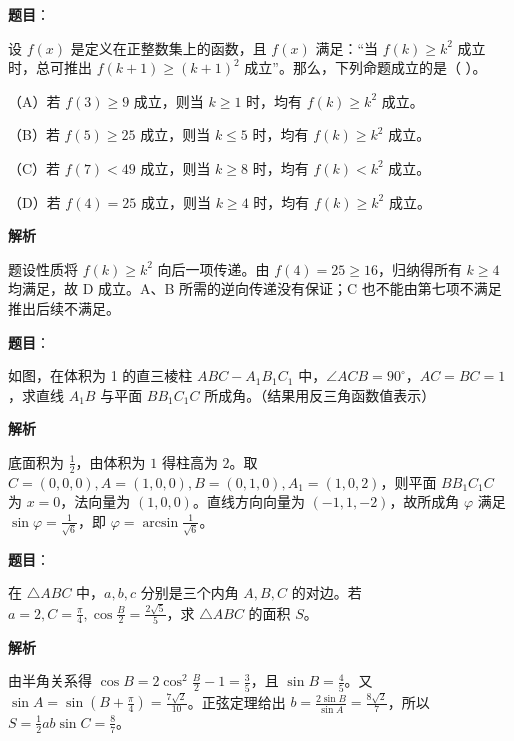 \begin{answer}

\textbf{题目}：

设 $f(x)$ 是定义在正整数集上的函数，且 $f(x)$ 满足：“当 $f(k)\ge k^2$ 成立时，总可推出 $f(k+1)\ge(k+1)^2$ 成立”。那么，下列命题成立的是（ ）。

（A）若 $f(3)\ge9$ 成立，则当 $k\ge1$ 时，均有 $f(k)\ge k^2$ 成立。

（B）若 $f(5)\ge25$ 成立，则当 $k\le5$ 时，均有 $f(k)\ge k^2$ 成立。

（C）若 $f(7)<49$ 成立，则当 $k\ge8$ 时，均有 $f(k)<k^2$ 成立。

（D）若 $f(4)=25$ 成立，则当 $k\ge4$ 时，均有 $f(k)\ge k^2$ 成立。

\textbf{解析}

题设性质将 $f(k)\ge k^2$ 向后一项传递。由 $f(4)=25\ge16$，归纳得所有 $k\ge4$ 均满足，故 D 成立。A、B 所需的逆向传递没有保证；C 也不能由第七项不满足推出后续不满足。


\end{answer}
\begin{answer}

\textbf{题目}：

如图，在体积为 1 的直三棱柱 $ABC-A_1B_1C_1$ 中，$\angle ACB=90^\circ$，$AC=BC=1$，求直线 $A_1B$ 与平面 $BB_1C_1C$ 所成角。（结果用反三角函数值表示）
\nopagebreak[4]
\begin{center}\end{center}
\nopagebreak[4]
\textbf{解析}

底面积为 $\frac12$，由体积为 $1$ 得柱高为 $2$。取 $C=(0,0,0),A=(1,0,0),B=(0,1,0),A_1=(1,0,2)$，则平面 $BB_1C_1C$ 为 $x=0$，法向量为 $(1,0,0)$。直线方向向量为 $(-1,1,-2)$，故所成角 $\varphi$ 满足 $\sin\varphi=\frac1{\sqrt6}$，即 $\varphi=\arcsin\frac1{\sqrt6}$。


\end{answer}
\begin{answer}

\textbf{题目}：

在 $\triangle ABC$ 中，$a,b,c$ 分别是三个内角 $A,B,C$ 的对边。若 $a=2,C=\frac\pi4,\cos\frac B2=\frac{2\sqrt5}{5}$，求 $\triangle ABC$ 的面积 $S$。

\textbf{解析}

由半角关系得 $\cos B=2\cos^2\frac B2-1=\frac35$，且 $\sin B=\frac45$。又 $\sin A=\sin(B+\frac\pi4)=\frac{7\sqrt2}{10}$。正弦定理给出 $b=\frac{2\sin B}{\sin A}=\frac{8\sqrt2}{7}$，所以 $S=\frac12ab\sin C=\frac87$。


\end{answer}
